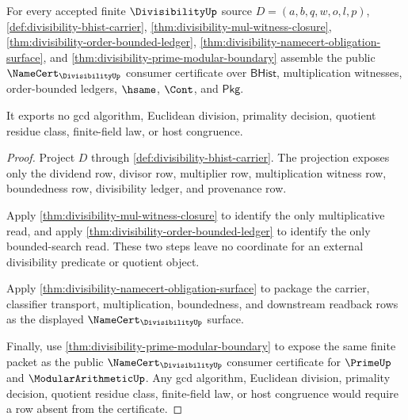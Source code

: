 \begin{theorem}
\label{thm:divisibility-public-certificate}
For every accepted finite $\DivisibilityUp$ source $D=(a,b,q,w,o,l,p)$,
\autoref{def:divisibility-bhist-carrier},
\autoref{thm:divisibility-mul-witness-closure},
\autoref{thm:divisibility-order-bounded-ledger},
\autoref{thm:divisibility-namecert-obligation-surface}, and
\autoref{thm:divisibility-prime-modular-boundary} assemble the public
$\NameCert_{\DivisibilityUp}$ consumer certificate over $\mathsf{BHist}$,
multiplication witnesses, order-bounded ledgers, $\hsame$, $\Cont$, and
$\mathsf{Pkg}$.

It exports no gcd algorithm, Euclidean division, primality decision,
quotient residue class, finite-field law, or host congruence.
\end{theorem}
\begin{proof}
Project $D$ through \autoref{def:divisibility-bhist-carrier}. The projection
exposes only the dividend row, divisor row, multiplier row, multiplication
witness row, boundedness row, divisibility ledger, and provenance row.

Apply \autoref{thm:divisibility-mul-witness-closure} to identify the only
multiplicative read, and apply
\autoref{thm:divisibility-order-bounded-ledger} to identify the only
bounded-search read. These two steps leave no coordinate for an external
divisibility predicate or quotient object.

Apply \autoref{thm:divisibility-namecert-obligation-surface} to package the
carrier, classifier transport, multiplication, boundedness, and downstream
readback rows as the displayed $\NameCert_{\DivisibilityUp}$ surface.

Finally, use \autoref{thm:divisibility-prime-modular-boundary} to expose the
same finite packet as the public $\NameCert_{\DivisibilityUp}$ consumer
certificate for $\PrimeUp$ and $\ModularArithmeticUp$. Any gcd algorithm,
Euclidean division, primality decision, quotient residue class, finite-field
law, or host congruence would require a row absent from the certificate.
\end{proof}

